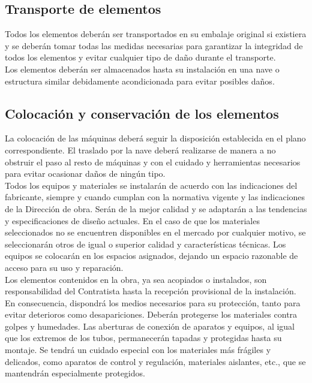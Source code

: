 \subsection{Transporte de elementos}
Todos los elementos deberán ser transportados en su embalaje original si existiera y se deberán tomar todas las medidas necesarias para garantizar la integridad de todos los elementos y evitar cualquier tipo de daño durante el transporte. 
\\
Los elementos deberán ser almacenados hasta su instalación en una nave o estructura similar debidamente acondicionada para evitar posibles daños.

\subsection{Colocación y conservación de los elementos}
La colocación de las máquinas deberá seguir la disposición establecida en el plano correspondiente. El traslado por la nave deberá realizarse de manera a no obstruir el paso al resto de máquinas y con el cuidado y herramientas necesarios para evitar ocasionar daños de ningún tipo.\\

Todos los equipos y materiales se instalarán de acuerdo con las indicaciones del fabricante, siempre y cuando cumplan con la normativa vigente y las indicaciones de la Dirección de obra. Serán de la mejor calidad y se adaptarán a las tendencias y especificaciones de diseño actuales. En el caso de que los materiales seleccionados no se encuentren disponibles en el mercado por cualquier motivo, se seleccionarán otros de igual o superior calidad y características técnicas. Los equipos se colocarán en los espacios asignados, dejando un espacio razonable de acceso para su uso y reparación.\\


Los elementos contenidos en la obra, ya sea acopiados o instalados, son responsabilidad del Contratista hasta la recepción provisional de la instalación. En consecuencia, dispondrá los medios necesarios para su protección, tanto para evitar deterioros como desapariciones. Deberán protegerse los materiales contra golpes y humedades. Las aberturas de conexión de aparatos y equipos, al igual que los extremos de los tubos, permanecerán tapadas y protegidas hasta su montaje. Se tendrá un cuidado especial con los materiales más frágiles y delicados, como aparatos de control y regulación, materiales aislantes, etc., que se mantendrán especialmente protegidos. \\

